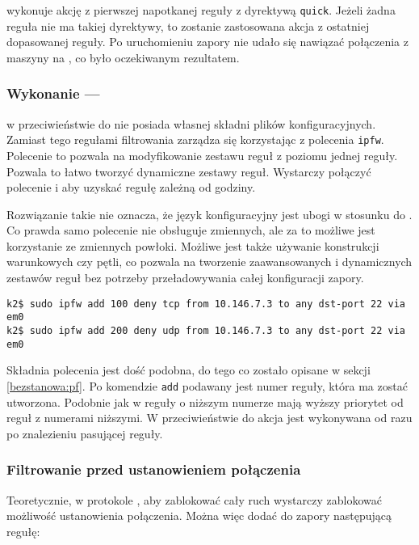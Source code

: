\pf{} wykonuje akcję z pierwszej napotkanej reguły z dyrektywą \texttt{quick}.
Jeżeli żadna reguła nie ma takiej dyrektywy, to zostanie zastosowana akcja z
ostatniej dopasowanej reguły. Po uruchomieniu zapory nie udało się nawiązać
połączenia \ssh{} z maszyny \volt{} na \emoip{}, co było oczekiwanym rezultatem.


\subsubsection{Wykonanie --- \ipfw{}}
\label{bezstanowa:ipfw}

\ipfw{} w przeciwieństwie do \pf{} nie posiada własnej składni plików
konfiguracyjnych. Zamiast tego regułami filtrowania zarządza się korzystając z
polecenia \texttt{ipfw}. Polecenie to pozwala na modyfikowanie zestawu reguł z
poziomu jednej reguły. Pozwala to łatwo tworzyć dynamiczne zestawy reguł.
Wystarczy połączyć polecenie \ipfw{} i \cron{} aby uzyskać regułę zależną od
godziny.

Rozwiązanie takie nie oznacza, że język konfiguracyjny jest ubogi w stosunku do
\pf{}. Co prawda samo polecenie \ipfw{} nie obsługuje zmiennych, ale za to
możliwe jest korzystanie ze zmiennych powłoki. Możliwe jest także używanie
konstrukcji warunkowych czy pętli, co pozwala na tworzenie zaawansowanych i
dynamicznych zestawów reguł bez potrzeby przeładowywania całej konfiguracji
zapory.

\begin{lstlisting}
k2$ sudo ipfw add 100 deny tcp from 10.146.7.3 to any dst-port 22 via em0
k2$ sudo ipfw add 200 deny udp from 10.146.7.3 to any dst-port 22 via em0
\end{lstlisting}

Składnia polecenia jest dość podobna, do tego co zostało opisane w sekcji
\ref{bezstanowa:pf}. Po komendzie \texttt{add} podawany jest numer reguły, która
ma zostać utworzona. Podobnie jak w \pf{} reguły o niższym numerze mają wyższy
priorytet od reguł z numerami niższymi. W przeciwieństwie do \pf{} akcja jest
wykonywana od razu po znalezieniu pasującej reguły.


\subsubsection{Filtrowanie przed ustanowieniem połączenia}

Teoretycznie, w protokole \tcp{}, aby zablokować cały ruch wystarczy zablokować
możliwość ustanowienia połączenia. Można więc dodać do zapory następującą
regułę:

